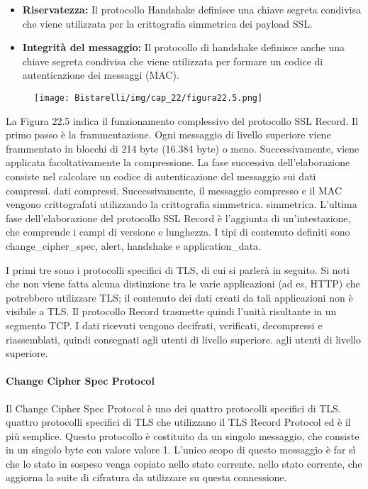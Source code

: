 \begin{itemize}
    \item  \textbf{Riservatezza:} Il protocollo Handshake definisce una chiave segreta condivisa che viene utilizzata per la crittografia simmetrica dei payload SSL.
    
    \item \textbf{Integrità del messaggio:} Il protocollo di handshake definisce anche una chiave segreta condivisa che viene utilizzata per formare un codice di autenticazione dei messaggi (MAC).
\end{itemize}

\begin{figure}[H]
	\centering
    \texttt{[image: Bistarelli/img/cap\_22/figura22.5.png]}
\end{figure}

La Figura 22.5 indica il funzionamento complessivo del protocollo SSL Record. Il primo passo è la frammentazione.
Ogni messaggio di livello superiore viene frammentato in blocchi di 214 byte (16.384 byte) o meno. Successivamente, viene applicata facoltativamente la compressione. La fase successiva dell'elaborazione consiste nel calcolare un codice di autenticazione del messaggio sui dati compressi. dati compressi. Successivamente, il messaggio compresso e il MAC vengono crittografati utilizzando la crittografia simmetrica. simmetrica. L'ultima fase dell'elaborazione del protocollo SSL Record è l'aggiunta di un'intestazione, che comprende i campi di versione e lunghezza. I tipi di contenuto definiti sono change\_cipher\_spec, alert, handshake e application\_data. 

\singlespacing

I primi tre sono i protocolli specifici di TLS, di cui si parlerà in seguito.  Si noti che non viene fatta alcuna distinzione tra le varie applicazioni (ad es, HTTP) che potrebbero utilizzare TLS; il contenuto dei dati creati da tali applicazioni non è visibile a TLS. Il protocollo Record trasmette quindi l'unità risultante in un segmento TCP. I dati ricevuti vengono decifrati, verificati, decompressi e riassemblati, quindi consegnati agli utenti di livello superiore.
agli utenti di livello superiore.

\singlespacing

\paragraph{Change Cipher Spec Protocol} Il Change Cipher Spec Protocol è uno dei quattro protocolli specifici di TLS.
quattro protocolli specifici di TLS che utilizzano il TLS Record Protocol ed è il più semplice. Questo protocollo è costituito da un singolo messaggio, che consiste in un singolo byte con valore valore 1. L'unico scopo di questo messaggio è far sì che lo stato in sospeso venga copiato nello stato corrente. nello stato corrente, che aggiorna la suite di cifratura da utilizzare su questa connessione. 

